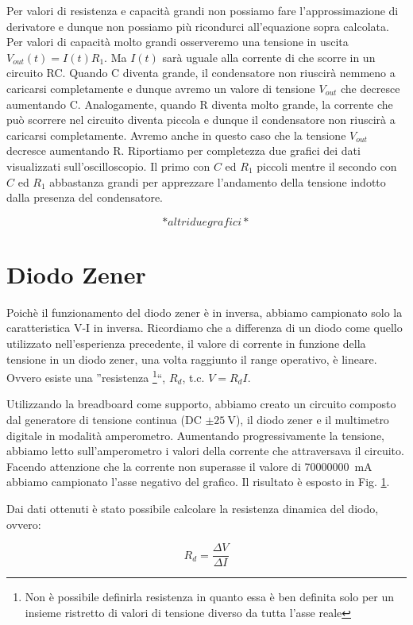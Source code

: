 Per valori di resistenza e capacità grandi non possiamo fare l'approssimazione di derivatore e dunque non possiamo più ricondurci all'equazione sopra calcolata. Per valori di capacità molto grandi osserveremo una tensione in uscita $V_{out}(t)=I(t) R_1$. Ma $I(t)$ sarà uguale alla corrente di che scorre in un circuito RC. Quando C diventa grande, il condensatore non riuscirà nemmeno a caricarsi completamente e dunque avremo un valore di tensione $V_{out}$ che decresce aumentando C. Analogamente, quando R diventa molto grande, la corrente che può scorrere nel circuito diventa piccola e dunque il condensatore non riuscirà a caricarsi completamente. Avremo anche in questo caso che la tensione $V_{out}$ decresce aumentando R. Riportiamo per completezza due grafici dei dati visualizzati sull'oscilloscopio. Il primo con $C$ ed $R_1$ piccoli mentre il secondo con $C$ ed $R_1$ abbastanza grandi per apprezzare l'andamento della tensione indotto dalla presenza del condensatore. 


$$*altri due grafici*$$




\section{Diodo Zener}
Poichè il funzionamento del diodo zener è in inversa, abbiamo campionato solo la caratteristica V-I in inversa. Ricordiamo che a differenza di un diodo come quello utilizzato nell'esperienza precedente, il valore di corrente in funzione della tensione in un diodo zener, una volta raggiunto il range operativo, è lineare. Ovvero esiste una ''resistenza \footnote{Non è possibile definirla resistenza in quanto essa è ben definita solo per un insieme ristretto di valori di tensione diverso da tutta l'asse reale}``, $R_d$, t.c. $V=R_d I$.

Utilizzando la breadboard come supporto, abbiamo creato un circuito composto dal generatore di tensione continua (DC $\pm \SI{25}{\volt}$), il diodo zener e il multimetro digitale in modalità amperometro. Aumentando progressivamente la tensione, abbiamo letto sull'amperometro i valori della corrente che attraversava il circuito.
Facendo attenzione che la corrente non superasse il valore di \SI{70000000}{\milli\ampere} abbiamo campionato l'asse negativo del grafico. Il risultato è esposto in Fig. \ref{}.

Dai dati ottenuti è stato possibile calcolare la resistenza dinamica del diodo, ovvero:

\begin{equation}
R_d=\frac{\Delta V}{\Delta I}
\label{scemopagliaccio}
\end{equation}

